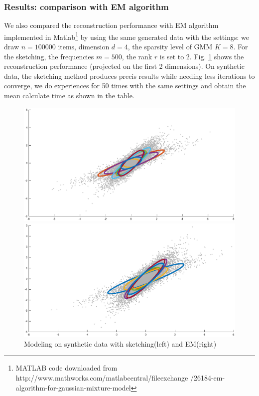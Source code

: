 \documentclass[12pt,a4paper]{article}
\begin{document}
\subsubsection{Results: comparison with EM algorithm}
We also compared the reconstruction performance with EM algorithm implemented in Matlab\footnote{MATLAB code downloaded from http://www.mathworks.com/matlabcentral/fileexchange \allowbreak /26184-em-algorithm-for-gaussian-mixture-model} by using the same generated data with the settings: we draw $n = 100000$ items, dimension $d = 4$, the sparsity level of GMM $K = 8$.
For the sketching, the frequencies $m = 500$, the rank $r$ is set to 2.  Fig. \ref{fig:2} shows the reconstruction performance (projected on the first 2 dimensions).
On synthetic data, the sketching method produces precis results while needing less iterations to converge, we do experiences for 50 times with the same settings and obtain the mean calculate time as shown in the table.
\begin{figure}[h]
    \begin{minipage}[t]{.45\textwidth}
      \centerline{\includegraphics[scale=0.25]{data_sk.eps}}
    \end{minipage}
    \begin{minipage}[t]{.45\textwidth}
      \centerline{\includegraphics[scale=0.25]{data_em.eps}}
    \end{minipage}
    \caption{Modeling on synthetic data with sketching(left) and EM(right)}
    \label{fig:2}
\end{figure}
\end{document}
